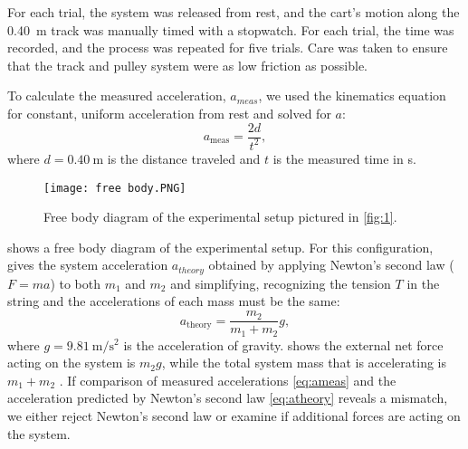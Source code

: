 \documentclass[reprint,amsmath,amssymb,aps]{revtex4-2}
\begin{document}
For each trial, the system was released from rest, and the cart’s motion along the \qty{0.40}{\meter} track was manually timed with a stopwatch. For each trial, the time was recorded, and the process was repeated for five trials. Care was taken to ensure that the track and pulley system were as low friction as possible.

To calculate the measured acceleration, $a_{meas}$, we used the kinematics equation for constant, uniform acceleration from rest \cite{tipler} and solved for $a$:
\begin{equation}
a_{\text{meas}} = \frac{2d}{t^2},
\label{eq:ameas}
\end{equation}
where $d=\qty{0.40}{\meter}$ is the distance traveled and $t$ is the measured time in \unit{\second}. 

\begin{figure}
\begin{center}
\texttt{[image: free body.PNG]}
\end{center}
\caption{\label{fig:fbd} Free body diagram of the experimental setup pictured in \cref{fig:1}.}
\end{figure}

 shows a free body diagram of the experimental setup. For this configuration, \cite{tipler} gives the system acceleration $a_{theory}$ obtained by applying Newton's second law ($F=ma$) to both $m_1$ and $m_2$ and simplifying, recognizing the tension $T$ in the string and the accelerations of each mass must be the same:
\begin{equation}
a_{\text{theory}} = \frac{m_2}{m_1 + m_2}g,
\label{eq:atheory}
\end{equation}
where $g=\qty{9.81}{\meter\per\second\squared}$ is the acceleration of gravity.  shows the external net force acting on the system is $m_2 g$, while the total system mass that is accelerating is $m_1+m_2$ \cite{tipler}. If comparison of measured accelerations \cref{eq:ameas} and the acceleration predicted by Newton's second law \cref{eq:atheory} reveals a mismatch, we either reject Newton's second law or examine if additional forces are acting on the system. 
\end{document}
